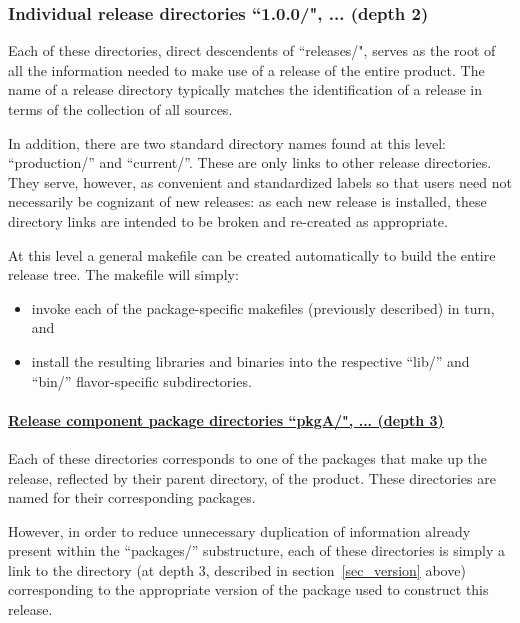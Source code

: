 \subsubsection{Individual release directories ``1.0.0/", ... (depth 2)}

    Each of these directories, direct descendents of ``releases/", serves as the
root of all the information needed to make use of a release of the entire 
product. The name of a release directory typically matches the identification 
of a release in terms of the collection of all sources. 

    In addition, there are two standard directory names found at this level: 
``production/'' and ``current/''. These are only links to other release 
directories. They serve, however, as convenient and standardized labels so 
that users need not necessarily be cognizant of new releases: as each new 
release is installed, these directory links are intended to be broken and 
re-created as appropriate.

    At this level a general makefile can be created automatically to build the 
entire release tree. The makefile will simply: 
\begin{itemize}
\item invoke each of the package-specific makefiles  
(previously described) in turn, and 

\item install the resulting libraries and binaries into the respective 
``lib/'' and ``bin/'' flavor-specific subdirectories. 
\end{itemize}
\paragraph{\underline{Release component package directories ``pkgA/", ... (depth 3)}}

    Each of these directories corresponds to one of the 
packages  that make up 
the release, reflected by their parent directory, of the product. These 
directories are named for their corresponding packages. 

    However, in order to reduce unnecessary duplication of information already 
present within the ``packages/'' substructure, each of these directories is 
simply a link to the directory (at depth 3, described in 
section~\ref{sec_version} above) corresponding to the appropriate version of 
the package used to construct this release. 

